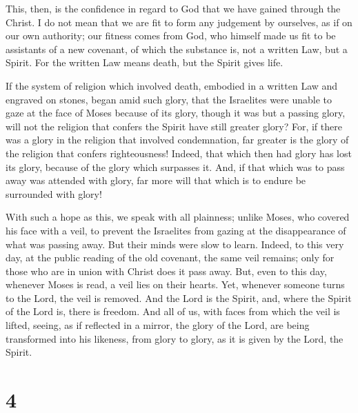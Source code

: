  This, then, is the confidence in regard to God that we have
gained through the Christ.  I do not mean that we are fit to
form any judgement by ourselves, as if on our own authority;
 our fitness comes from God, who himself made us fit to be
assistants of a new covenant, of which the substance is, not a written
Law, but a Spirit. For the written Law means death, but the Spirit gives
life.

 If the system of religion which involved death, embodied in
a written Law and engraved on stones, began amid such glory, that the
Israelites were unable to gaze at the face of Moses because of its
glory, though it was but a passing glory,  will not the
religion that confers the Spirit have still greater glory? 
For, if there was a glory in the religion that involved condemnation,
far greater is the glory of the religion that confers righteousness!
 Indeed, that which then had glory has lost its glory,
because of the glory which surpasses it.  And, if that
which was to pass away was attended with glory, far more will that which
is to endure be surrounded with glory!

 With such a hope as this, we speak with all plainness;
 unlike Moses, who covered his face with a veil, to prevent
the Israelites from gazing at the disappearance of what was passing
away.  But their minds were slow to learn. Indeed, to this
very day, at the public reading of the old covenant, the same veil
remains; only for those who are in union with Christ does it pass away.
 But, even to this day, whenever Moses is read, a veil lies
on their hearts.  Yet, whenever someone turns to the Lord,
the veil is removed.  And the Lord is the Spirit, and,
where the Spirit of the Lord is, there is freedom.  And all
of us, with faces from which the veil is lifted, seeing, as if reflected
in a mirror, the glory of the Lord, are being transformed into his
likeness, from glory to glory, as it is given by the Lord, the Spirit.

\hypertarget{section-3}{%
\section{4}\label{section-3}}

